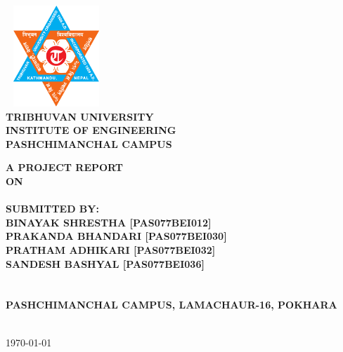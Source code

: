 \begin{titlingpage} 
    \begin{normalsize}
    \begin{center}
    \includegraphics[width=1.5in, height=1.5in]{./Graphics/logo.png}\\
    
    \bfseries 
    TRIBHUVAN UNIVERSITY\\
     INSTITUTE OF ENGINEERING\\
    
    \textbf{\MakeUppercase PASHCHIMANCHAL CAMPUS}\\
    \end{center}
    \vspace{1cm}
    
    \begin{center}
    \textbf{A PROJECT REPORT}\\
    \textbf{ON}\\
    \textbf{\MakeUppercase \thetitle} \\
    \vspace{1.5 cm}
    \bfseries SUBMITTED BY:\\
    \textbf{\MakeUppercase {Binayak Shrestha [PAS077BEI012]}}\\
    \textbf{\MakeUppercase {Prakanda Bhandari [PAS077BEI030]}}\\
    \textbf{\MakeUppercase {Pratham Adhikari [PAS077BEI032]}}\\
    \textbf{\MakeUppercase {Sandesh Bashyal [PAS077BEI036]}}\\
    \vspace{2 cm}
    \\
    \bfseries {}\\
    \MakeUppercase {Pashchimanchal Campus, Lamachaur-16, Pokhara}\par\\
    \vspace{1.5cm}
    {\monthyeardate\today}
    \end{center}
    \end{normalsize}
    \end{titlingpage}
    \newpage